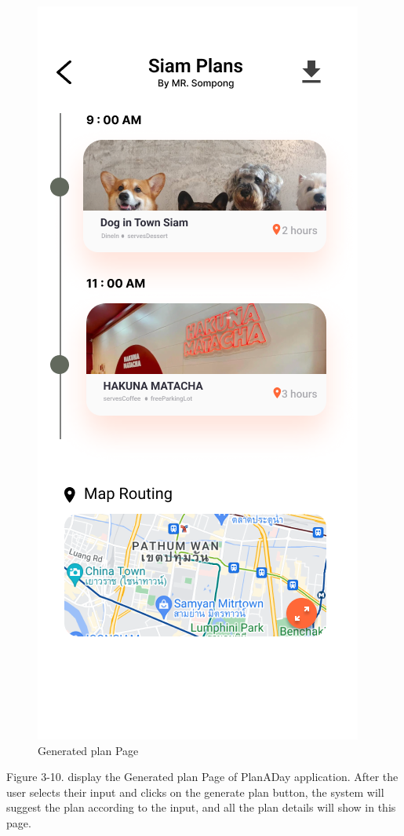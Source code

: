 \newpage
\begin{figure}[!h]
    \centering
    \includegraphics[width=0.5\linewidth]{chapter3/UI_Other_plan.png}
    \caption{Generated plan Page}
    \label{fig:Generated plan Page}
\end{figure}
\noindent
Figure 3-10. display the Generated plan Page of PlanADay application. After the
user selects their input and clicks on the generate plan button, the system will
suggest the plan according to the input, and all the plan details will show in this
page.

